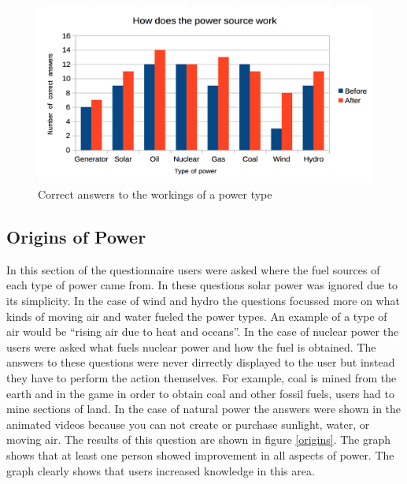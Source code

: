 \documentclass[msc,oneside]{ubcthesis}%
\begin{document}
\begin{figure}[hbt]
  \begin{center}
    \includegraphics[width=1\textwidth]{survey_pics/post_and_pre/workings}
    \caption[Working Powerplants ]{Correct answers to the workings of a power type}\label{workings}
  \end{center}
\end{figure}

\subsection{Origins of Power}
  In this section of the questionnaire users were asked where the fuel sources of each type of power came from. In these questions solar power was ignored due to its simplicity. In the case of wind and hydro the questions focussed more on what kinds of moving air and water fueled the power types. An example of a type of air would be ``rising air due to heat and oceans''. In the case of nuclear power the users were asked what fuels nuclear power and how the fuel is obtained. The answers to these questions were never dirrectly displayed to the user but instead they have to perform the action themselves. For example, coal is mined from the earth and in the game in order to obtain coal and other fossil fuels, users had to mine sections of land. In the case of natural power the answers were shown in the animated videos because you can not create or purchase sunlight, water, or moving air. The results of this question are shown in figure \ref{origins}. The graph shows that at least one person showed improvement in all aspects of power. The graph clearly shows that users increased knowledge in this area.
\end{document}
